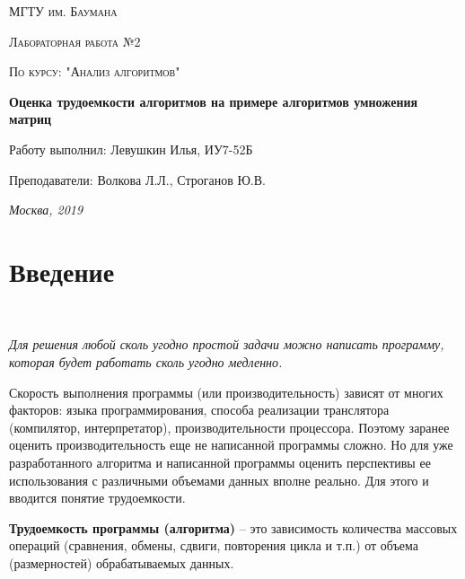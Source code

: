 \documentclass[12pt]{report}
\begin{document}
	\begin{titlepage}
		\centering
		{\scshape\LARGE МГТУ им. Баумана \par}
		\vspace{3cm}
		{\scshape\Large Лабораторная работа №2\par}
		\vspace{0.5cm}	
		{\scshape\Large По курсу: "Анализ алгоритмов"\par}
		\vspace{1.5cm}
		{\huge\bfseries Оценка трудоемкости алгоритмов на примере алгоритмов умножения матриц\par}
		\vspace{2cm}
		{\Large Работу выполнил: Левушкин Илья, ИУ7-52Б\par}
		\vspace{0.5cm}
		{\Large Преподаватели:  Волкова Л.Л., Строганов Ю.В.\par}
		
		\vfill
		\large \textit {Москва, 2019} \par
	\end{titlepage}
	
	\tableofcontents
	
	\newpage
	\chapter*{Введение}
	
	~\
	
	
	 \begin{displayquote}
	 	\textit{
	 Для решения любой сколь угодно простой задачи можно написать программу, которая будет работать сколь угодно медленно.
	}
	 \end{displayquote}
	
	Скорость выполнения программы (или производительность) зависят от многих факторов: языка программирования, способа реализации транслятора (компилятор, интерпретатор), производительности процессора. Поэтому заранее оценить производительность еще не написанной программы сложно. Но для уже разработанного алгоритма и написанной программы оценить перспективы ее использования с различными объемами данных вполне реально. Для этого и вводится понятие трудоемкости.
	
	\textbf{Трудоемкость программы (алгоритма)} – это зависимость количества массовых операций (сравнения, обмены, сдвиги, повторения цикла и т.п.) от объема (размерностей) обрабатываемых данных.
	
\end{document}
